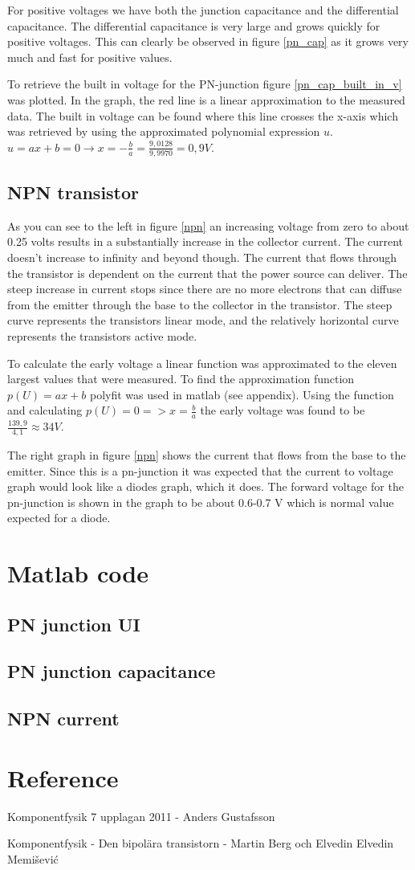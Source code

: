 \documentclass[a4paper]{article}
\begin{document}
For positive voltages we have both the junction capacitance and the differential capacitance. The differential capacitance is very large and grows quickly for positive voltages. This can clearly be observed in figure \ref{pn_cap} as it grows very much and fast for positive values.

To retrieve the built in voltage for the PN-junction figure \ref{pn_cap_built_in_v} was plotted. In the graph, the red line is a linear approximation to the measured data. The built in voltage can be found where this line crosses the x-axis which was retrieved by using the approximated polynomial expression $u$. $ u = ax + b = 0 \rightarrow x = -\frac{b}{a} = \frac{9,0128}{9,9970} = 0,9V$.

\subsection{NPN transistor}
As you can see to the left in figure \ref{npn} an increasing voltage from zero to about 0.25 volts results in a substantially increase in the collector current. The current doesn't increase to infinity and beyond though. The current that flows through the transistor is dependent on the current that the power source can deliver. The steep increase in current stops since there are no more electrons that can diffuse from the emitter through the base to the collector in the transistor. The steep curve represents the transistors linear mode, and the relatively horizontal curve represents the transistors active mode.

To calculate the early voltage a linear function was approximated to the eleven largest values that were measured. To find the approximation function $p(U) = ax + b$ polyfit was used in matlab (see appendix). Using the function and calculating $p(U) = 0 => x = \frac{b}{a}$ the early voltage was found to be $\frac{139,9}{4,1} \approx 34V$.

The right graph in figure \ref{npn} shows the current that flows from the base to the emitter. Since this is a pn-junction it was expected that the current to voltage graph would look like a diodes graph, which it does. The forward voltage for the pn-junction is shown in the graph to be about 0.6-0.7 V which is normal value expected for a diode.

\newpage
\appendix
\section{Matlab code}
\subsection{PN junction UI}

\subsection{PN junction capacitance}

\subsection{NPN current}


\newpage
\section{Reference}
Komponentfysik  7 upplagan 2011 - Anders Gustafsson

Komponentfysik - Den bipolära transistorn - Martin Berg och Elvedin Elvedin Memišević
\end{document}
